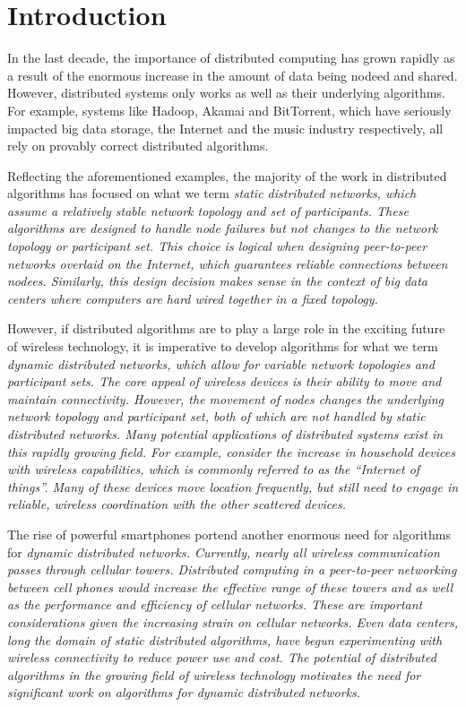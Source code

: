 \documentclass[english]{article}
\begin{document}
\section{Introduction}

In the last decade, the importance of distributed computing has grown rapidly as a result of the enormous increase in the amount of data being nodeed and shared. However, distributed systems only works as well as their underlying algorithms. For example, systems like Hadoop, Akamai and BitTorrent, which have seriously impacted big data storage, the Internet and the music industry respectively, all rely on provably correct distributed algorithms. 

Reflecting the aforementioned examples, the majority of the work in distributed algorithms has focused on what we term \em static distributed networks\em, which assume a relatively stable network topology and set of participants. These algorithms are designed to handle node failures but not changes to the network topology or participant set. This choice is logical when designing peer-to-peer networks overlaid on the Internet, which guarantees reliable connections between nodees. Similarly, this design decision makes sense in the context of big data centers where computers are hard wired together in a fixed topology. 

However, if distributed algorithms are to play a large role in the exciting future of wireless technology, it is imperative to develop algorithms for what we term \em dynamic distributed networks\em, which allow for variable network topologies and participant sets. The core appeal of wireless devices is their ability to move and maintain connectivity. However, the movement of nodes changes the underlying network topology and participant set, both of which are not handled by \em static distributed networks\em. Many potential applications of distributed systems exist in this rapidly growing field. For example, consider the increase in household devices with wireless capabilities, which is commonly referred to as the ``Internet of things''. Many of these devices move location frequently, but still need to engage in reliable, wireless coordination with the other scattered devices.

The rise of powerful smartphones portend another enormous need for algorithms for \em dynamic distributed networks\em. Currently, nearly all wireless communication passes through cellular towers. Distributed computing in a peer-to-peer networking between cell phones would increase the effective range of these towers and as well as the performance and efficiency of cellular networks. These are important considerations given the increasing strain on cellular networks. Even data centers, long the domain of static distributed algorithms, have begun experimenting with wireless connectivity to reduce power use and cost. The potential of distributed algorithms in the growing field of wireless technology motivates the need for significant work on algorithms for \em dynamic distributed networks\em.
\end{document}
